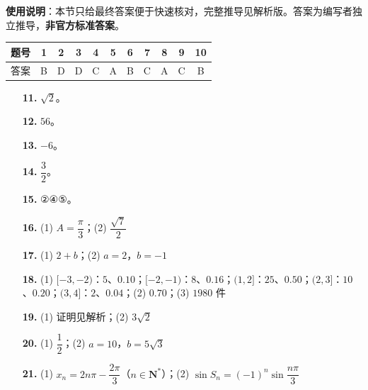 
\begin{gknotice}
\textbf{使用说明}：本节只给最终答案便于快速核对，完整推导见解析版。答案为编写者独立推导，\textbf{非官方标准答案}。
\end{gknotice}

\begin{center}\begin{tabular}{ccccccccccc}
\toprule
题号 & 1 & 2 & 3 & 4 & 5 & 6 & 7 & 8 & 9 & 10 \\
\midrule
答案 & B & D & D & C & A & B & C & A & C & B \\
\bottomrule
\end{tabular}\end{center}

\begin{itemize}[leftmargin=2.6em]
  \item[\textbf{11.}] $\sqrt2$。
  \item[\textbf{12.}] $56$。
  \item[\textbf{13.}] $-6$。
  \item[\textbf{14.}] $\dfrac32$。
  \item[\textbf{15.}] ②④⑤。
\end{itemize}

\begin{itemize}[leftmargin=2.6em]
  \item[\textbf{16.}] (1) $A=\dfrac\pi3$；(2) $\dfrac{\sqrt7}2$
  \item[\textbf{17.}] (1) $2+b$；(2) $a=2$，$b=-1$
  \item[\textbf{18.}] (1) $[-3,-2)$：$5$、$0.10$；$[-2,-1)$：$8$、$0.16$；$(1,2]$：$25$、$0.50$；$(2,3]$：$10$、$0.20$；$(3,4]$：$2$、$0.04$；(2) $0.70$；(3) $1980$ 件
  \item[\textbf{19.}] (1) 证明见解析；(2) $3\sqrt2$
  \item[\textbf{20.}] (1) $\dfrac12$；(2) $a=10$，$b=5\sqrt3$
  \item[\textbf{21.}] (1) $x_n=2n\pi-\dfrac{2\pi}3$（$n\in\mathbf N^*$）；(2) $\sin S_n=(-1)^n\sin\dfrac{n\pi}3$
\end{itemize}
